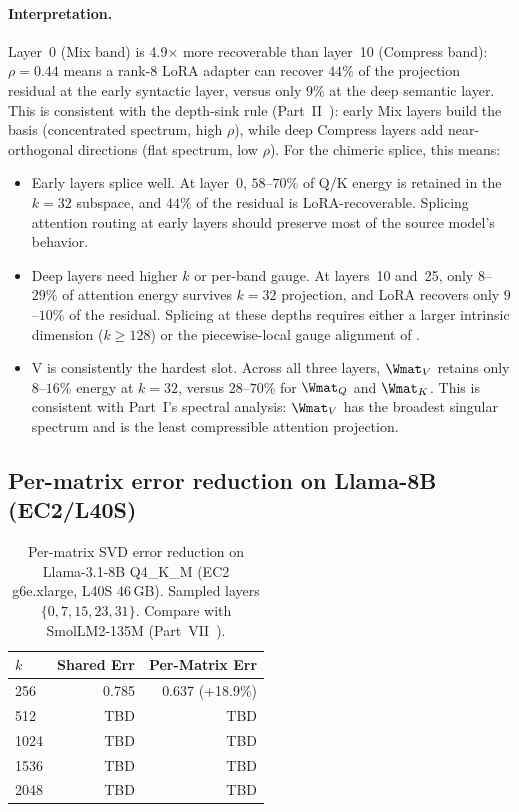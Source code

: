 \documentclass[11pt]{article}
\begin{document}
\paragraph{Interpretation.} Layer~0 (Mix band) is 4.9$\times$
more recoverable than layer~10 (Compress band): $\rho{=}0.44$ means
a rank-8 LoRA adapter can recover $44\%$ of the projection residual
at the early syntactic layer, versus only $9\%$ at the deep semantic
layer. This is consistent with the depth-sink rule
(Part~II~\cite{stewart2026gp}): early Mix layers build the basis
(concentrated spectrum, high $\rho$), while deep Compress layers add
near-orthogonal directions (flat spectrum, low $\rho$). For the
chimeric splice, this means:

\begin{itemize}
\item Early layers splice well. At layer~0, $58$--$70\%$
 of Q/K energy is retained in the $k{=}32$ subspace, and
 $44\%$ of the residual is LoRA-recoverable. Splicing
 attention routing at early layers should preserve most
 of the source model's behavior.

\item Deep layers need higher $k$ or per-band gauge.
 At layers~10 and~25, only $8$--$29\%$ of attention energy
 survives $k{=}32$ projection, and LoRA recovers only
 $9$--$10\%$ of the residual. Splicing at these depths
 requires either a larger intrinsic dimension ($k{\ge}128$)
 or the piecewise-local gauge alignment of
 .

\item V is consistently the hardest slot. Across all
 three layers, $\Wmat_V$ retains only $8$--$16\%$ energy at
 $k{=}32$, versus $28$--$70\%$ for $\Wmat_Q$ and $\Wmat_K$.
 This is consistent with Part~I's spectral analysis: $\Wmat_V$
 has the broadest singular spectrum and is the least
 compressible attention projection.
\end{itemize}

\subsection{Per-matrix error reduction on Llama-8B (EC2/L40S)}

\begin{table}[h]\centering\small
\caption{Per-matrix SVD error reduction on Llama-3.1-8B Q4\_K\_M
(EC2 g6e.xlarge, L40S 46\,GB). Sampled layers $\{0,7,15,23,31\}$.
Compare with SmolLM2-135M (Part~VII~\cite{stewart2026ffn}).}
\label{tab:per-matrix-llama8b}
\begin{tabular}{@{}lrr@{}}
\toprule
$k$ & Shared Err & Per-Matrix Err \\
\midrule
256 & 0.785 & 0.637 (+18.9\%) \\
512 & TBD & TBD \\
1024 & TBD & TBD \\
1536 & TBD & TBD \\
2048 & TBD & TBD \\
\bottomrule
\end{tabular}
\end{table}
\end{document}

